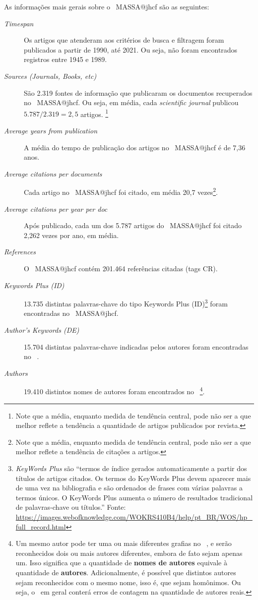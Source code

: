 As informações mais gerais sobre o \dataset\   MASSA@jhcf são as seguintes:
\begin{description}
    \item [\textit{Timespan}] Os artigos que atenderam aos critérios de busca e filtragem foram publicados a partir de 1990, até 2021. Ou seja, não foram encontrados registros entre 1945 e 1989.
    \item [\textit{Sources (Journals, Books, etc)}] São 2.319 fontes de informação que publicaram os documentos recuperados no \dataset\   MASSA@jhcf. Ou seja, em média, cada \textit{scientific journal} publicou $5.787/2.319=2,5$ artigos. \footnote{Note que a média, enquanto medida de tendência central, pode não ser a que melhor reflete a tendência a quantidade de artigos publicados por revista.}
    \item [\textit{Average years from publication}] A média do tempo de publicação dos artigos no \dataset\   MASSA@jhcf é de 7,36 anos.
    \item [\textit{Average citations per documents}] Cada artigo no \dataset\   MASSA@jhcf foi citado, em média 20,7 vezes\footnote{Note que a média, enquanto medida de tendência central, pode não ser a que melhor reflete a tendência de  citações a artigos.}.
    \item [\textit{Average citations per year per doc}] Após publicado, cada um dos 5.787 artigos do \dataset\   MASSA@jhcf  foi citado 2,262 vezes por ano, em média.
    \item [\textit{References}] O \dataset\   MASSA@jhcf contém 201.464 referências citadas (tags CR).
    \item [\textit{Keywords Plus (ID)}] 13.735 distintas palavras-chave do tipo Keywords Plus (ID)\footnote{\textit{KeyWords Plus} são ``termos de índice gerados automaticamente a partir dos títulos de artigos citados. Os termos do KeyWords Plus devem aparecer mais de uma vez na bibliografia e são ordenados de frases com várias palavras a termos únicos. O KeyWords Plus aumenta o número de resultados tradicional de palavras-chave ou títulos.'' Fonte: \url{https://images.webofknowledge.com/WOKRS410B4/help/pt_BR/WOS/hp_full_record.html}} foram encontradas no \dataset\   MASSA@jhcf. 
    \item [\textit{Author's Keywords (DE)}] 15.704 distintas palavras-chave indicadas pelos autores foram encontradas no \dataset\  .
    \item [\textit{Authors}] 19.410 distintos nomes de autores foram encontrados no \dataset\  \footnote{Um mesmo autor pode ter uma ou mais diferentes grafias no \dataset\  , e serão reconhecidos dois ou mais autores diferentes, embora de fato sejam apenas um. Isso significa que a quantidade de \textbf{nomes de autores} equivale à quantidade de \textbf{autores}. Adicionalmente, é possível que distintos autores sejam reconhecidos com o mesmo nome, isso é, que sejam homônimos. Ou seja, o \dataset\   em geral conterá erros de contagem na quantidade de autores reais.}.

\end{description}
